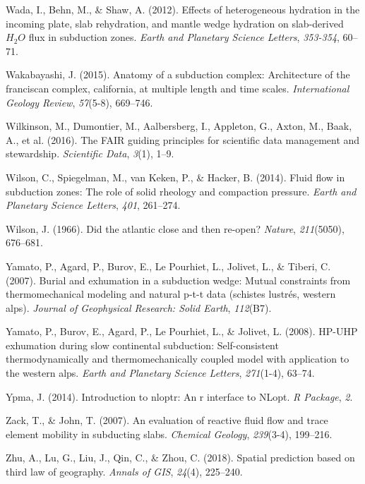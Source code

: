 \begin{CSLReferences}{1}{1}
\leavevmode{}%
Wada, I., Behn, M., \& Shaw, A. (2012). Effects of heterogeneous hydration in the incoming plate, slab rehydration, and mantle wedge hydration on slab-derived \(H_2O\) flux in subduction zones. \emph{Earth and Planetary Science Letters}, \emph{353-354}, 60--71.

\leavevmode{}%
Wakabayashi, J. (2015). Anatomy of a subduction complex: Architecture of the franciscan complex, california, at multiple length and time scales. \emph{International Geology Review}, \emph{57}(5-8), 669--746.

\leavevmode{}%
Wilkinson, M., Dumontier, M., Aalbersberg, I., Appleton, G., Axton, M., Baak, A., et al. (2016). The FAIR guiding principles for scientific data management and stewardship. \emph{Scientific Data}, \emph{3}(1), 1--9.

\leavevmode{}%
Wilson, C., Spiegelman, M., van Keken, P., \& Hacker, B. (2014). Fluid flow in subduction zones: The role of solid rheology and compaction pressure. \emph{Earth and Planetary Science Letters}, \emph{401}, 261--274.

\leavevmode{}%
Wilson, J. (1966). Did the atlantic close and then re-open? \emph{Nature}, \emph{211}(5050), 676--681.

\leavevmode{}%
Yamato, P., Agard, P., Burov, E., Le Pourhiet, L., Jolivet, L., \& Tiberi, C. (2007). Burial and exhumation in a subduction wedge: Mutual constraints from thermomechanical modeling and natural p-t-t data (schistes lustr{é}s, western alps). \emph{Journal of Geophysical Research: Solid Earth}, \emph{112}(B7).

\leavevmode{}%
Yamato, P., Burov, E., Agard, P., Le Pourhiet, L., \& Jolivet, L. (2008). HP-UHP exhumation during slow continental subduction: Self-consistent thermodynamically and thermomechanically coupled model with application to the western alps. \emph{Earth and Planetary Science Letters}, \emph{271}(1-4), 63--74.

\leavevmode{}%
Ypma, J. (2014). Introduction to nloptr: An r interface to NLopt. \emph{R Package}, \emph{2}.

\leavevmode{}%
Zack, T., \& John, T. (2007). An evaluation of reactive fluid flow and trace element mobility in subducting slabs. \emph{Chemical Geology}, \emph{239}(3-4), 199--216.

\leavevmode{}%
Zhu, A., Lu, G., Liu, J., Qin, C., \& Zhou, C. (2018). Spatial prediction based on third law of geography. \emph{Annals of GIS}, \emph{24}(4), 225--240.

\end{CSLReferences}

